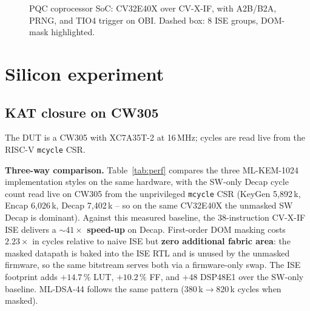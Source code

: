 \documentclass[10pt,conference]{IEEEtran}
\newcommand{\mlkem}{ML-KEM-1024\xspace}
\newcommand{\mldsa}{ML-DSA-44\xspace}
\begin{document}
\begin{figure}[!t]
{}
\caption{PQC coprocessor SoC: CV32E40X over CV-X-IF, with A2B/B2A, PRNG, and TIO4 trigger on OBI. Dashed box: 8 ISE groups, DOM-mask highlighted.}
\label{fig:soc_flow}
\end{figure}

\section{Silicon experiment}

\subsection{KAT closure on CW305}
\label{sec:kat}

The DUT is a CW305 with XC7A35T-2 at 16\,MHz; cycles are read live from the RISC-V \texttt{mcycle} CSR.

\textbf{Three-way comparison.} Table~\ref{tab:perf} compares the three \mlkem implementation styles on the same hardware, with the SW-only Decap cycle count read live on CW305 from the unprivileged \texttt{mcycle} CSR (KeyGen 5{,}892\,k, Encap 6{,}026\,k, Decap 7{,}402\,k -- so on the same CV32E40X the unmasked SW Decap is dominant). Against this measured baseline, the 38-instruction CV-X-IF ISE delivers a \textbf{${\sim}41\times$ speed-up} on Decap. First-order DOM masking costs $2.23\times$ in cycles relative to naive ISE but \textbf{zero additional fabric area}: the masked datapath is baked into the ISE RTL and is unused by the unmasked firmware, so the same bitstream serves both via a firmware-only swap. The ISE footprint adds $+14.7\,\%$ LUT, $+10.2\,\%$ FF, and $+48$ DSP48E1 over the SW-only baseline. \mldsa follows the same pattern (380\,k$\to$820\,k cycles when masked).
\end{document}

